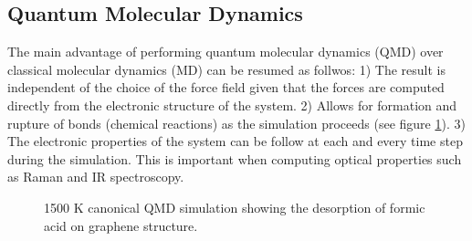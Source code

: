 
\subsection{Quantum Molecular Dynamics}
% 
The main advantage of performing quantum molecular dynamics (QMD) over classical molecular dynamics (MD) can be resumed as follwos: 1) The result is independent of the choice of the force field given that the forces are computed directly from the electronic structure of the system. 2) Allows for formation and rupture of bonds (chemical reactions) as the simulation proceeds (see figure \ref{cooh}). 3) The electronic properties of the system can be follow at each and every time step during the simulation. This is important when computing optical properties such as Raman and IR spectroscopy. 

\begin{figure}[h]
  \begin{center}  
  \end{center}
\caption{1500 K canonical QMD simulation showing the desorption of formic acid on graphene structure.} 
\label{cooh}
\end{figure}

